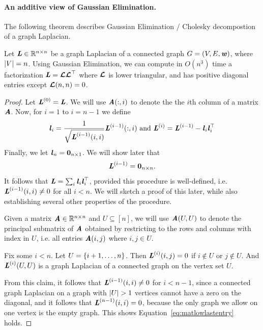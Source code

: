 \paragraph{An additive view of Gaussian Elimination.}
The following theorem describes Gaussian Elimination / Cholesky
decompostion of a graph Laplacian.
\begin{theorem}
 Let $\LL
 \in \R^{n \times n}$ be a graph Laplacian of a connected
 graph $G = (V,E,\ww)$, where
$\abs{V} = n$.
 Using Gaussian Elimination, we can compute in $O(n^3)$ time a
 factorization $\LL = \matlow\matlow^{\trp}$ where $\matlow$ is lower
 triangular, and has positive diagonal entries except $\matlow(n,n) = 0$.
\end{theorem}
\begin{proof}
  Let $\LL^{(0)} = \LL$.
We will use $\AA(:,i)$ to denote the the $i$th column of a matrix $\AA$.
Now, for $i = 1$ to $i = n-1$ we define
\[
  \ll_i = \frac{1}{\sqrt{\LL^{(i-1)}(i,i)}} \LL^{(i-1)}(:,i)
  \text{ and }
   \LL^{(i)}  = \LL^{(i-1)} - \ll_i \ll_i^{\trp}
 \]
 Finally, we let $\ll_n = \veczero_{n \times 1}$.
 We will show later that
 \begin{equation}
   \label{eq:matlowlastentry}
   \LL^{(i-1)} = \matzero_{n \times n}.
 \end{equation}
 It follows that $\LL = \sum_{i} \ll_i \ll_i^{\trp}$, provided this
 procedure is well-defined, i.e. $\LL^{(i-1)}(i,i) \neq 0$ for all $i
< n$. We will sketch a proof of this later, while also establishing
several other properties of the procedure.

Given a matrix $\AA \in \R^{n \times n}$ and $U \subseteq [n]$, we will use $\AA(U, U)$ to
denote the principal submatrix of $\AA$ obtained by restricting to the
rows and columns with index in $U$, i.e. all entries $\AA(i,j)$ where
$i,j \in U$.
\begin{claim}
  \label{clm:schurconnected}
  Fix some $i < n$.
  Let $U = \setof{i+1,\ldots,n}$.
  Then $\LL^{(i)}(i,j) = 0$ if $i \not\in U$ or $j \not\in U$.
  And $\LL^{(i)}(U, U)$ is a graph Laplacian of a connected graph on
  the vertex set $U$.
\end{claim}
From this claim, it follows that $\LL^{(i-1)}(i,i) \neq 0$ for $i<n-1$,
since a connected graph Laplacian on a graph with $\abs{U} > 1$
vertices cannot have a zero on the diagonal, and it follows that
$\LL^{(n-1)}(i,i) = 0$, because the only graph we allow on one vertex
is the empty graph. This shows Equation~\eqref{eq:matlowlastentry} holds.
\end{proof}

